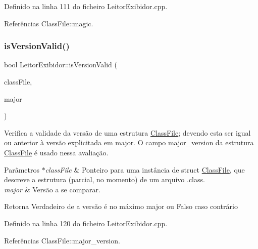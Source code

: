 Definido na linha 111 do ficheiro Leitor\+Exibidor.\+cpp.



Referências Class\+File\+::magic.

\mbox{\label{classLeitorExibidor_a11629e5b6b841cefaa2f8544ef2b9ab1}} 
\subsubsection{\texorpdfstring{is\+Version\+Valid()}{isVersionValid()}}
{\footnotesize\ttfamily bool Leitor\+Exibidor\+::is\+Version\+Valid (\begin{DoxyParamCaption}\item[{\hyperlink{classClassFile}{Class\+File} $\ast$}]{class\+File,  }\item[{uint16\+\_\+t}]{major }\end{DoxyParamCaption})\hspace{0.3cm}{\ttfamily [private]}}

Verifica a validade da versão de uma estrutura \hyperlink{classClassFile}{Class\+File}; devendo esta ser igual ou anterior à versão explicitada em major. O campo major\+\_\+version da estrutura \hyperlink{classClassFile}{Class\+File} é usado nessa avaliação. 
\begin{DoxyParams}{Parâmetros}
{\em $\ast$class\+File} & Ponteiro para uma instância de struct \hyperlink{classClassFile}{Class\+File}, que descreve a estrutura (parcial, no momento) de um arquivo .class. \\
\hline
{\em major} & Versão a se comparar. \\
\hline
\end{DoxyParams}
\begin{DoxyReturn}{Retorna}
Verdadeiro de a versão é no máximo major ou Falso caso contrário 
\end{DoxyReturn}


Definido na linha 120 do ficheiro Leitor\+Exibidor.\+cpp.



Referências Class\+File\+::major\+\_\+version.

\mbox{\label{classLeitorExibidor_ad273b8b4b3210bf1c246b1226bdaf1c8}} 
